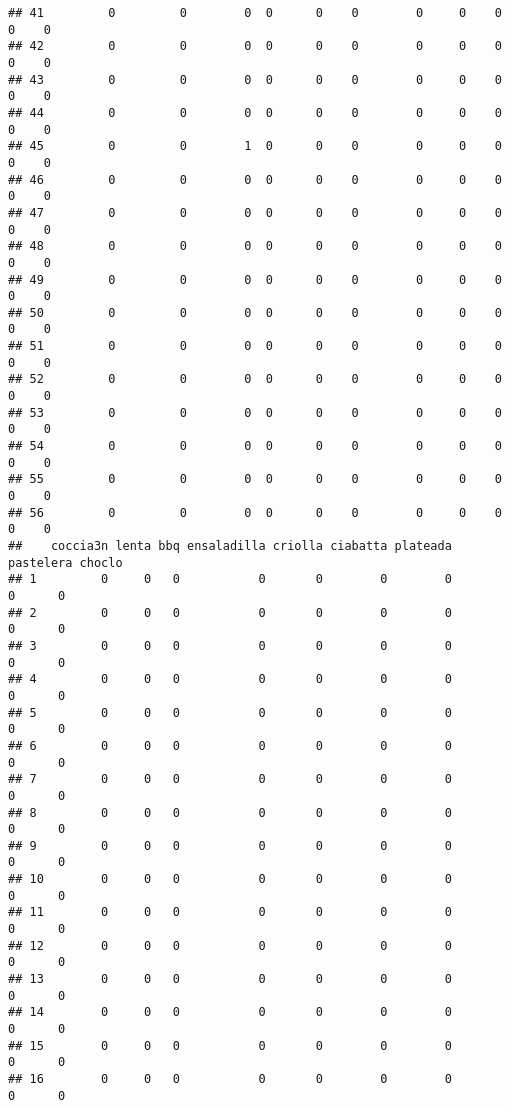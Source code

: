 \documentclass[
]{article}
\begin{document}
\begin{verbatim}
## 41         0         0        0  0      0    0        0     0    0    0    0
## 42         0         0        0  0      0    0        0     0    0    0    0
## 43         0         0        0  0      0    0        0     0    0    0    0
## 44         0         0        0  0      0    0        0     0    0    0    0
## 45         0         0        1  0      0    0        0     0    0    0    0
## 46         0         0        0  0      0    0        0     0    0    0    0
## 47         0         0        0  0      0    0        0     0    0    0    0
## 48         0         0        0  0      0    0        0     0    0    0    0
## 49         0         0        0  0      0    0        0     0    0    0    0
## 50         0         0        0  0      0    0        0     0    0    0    0
## 51         0         0        0  0      0    0        0     0    0    0    0
## 52         0         0        0  0      0    0        0     0    0    0    0
## 53         0         0        0  0      0    0        0     0    0    0    0
## 54         0         0        0  0      0    0        0     0    0    0    0
## 55         0         0        0  0      0    0        0     0    0    0    0
## 56         0         0        0  0      0    0        0     0    0    0    0
##    coccia3n lenta bbq ensaladilla criolla ciabatta plateada pastelera choclo
## 1         0     0   0           0       0        0        0         0      0
## 2         0     0   0           0       0        0        0         0      0
## 3         0     0   0           0       0        0        0         0      0
## 4         0     0   0           0       0        0        0         0      0
## 5         0     0   0           0       0        0        0         0      0
## 6         0     0   0           0       0        0        0         0      0
## 7         0     0   0           0       0        0        0         0      0
## 8         0     0   0           0       0        0        0         0      0
## 9         0     0   0           0       0        0        0         0      0
## 10        0     0   0           0       0        0        0         0      0
## 11        0     0   0           0       0        0        0         0      0
## 12        0     0   0           0       0        0        0         0      0
## 13        0     0   0           0       0        0        0         0      0
## 14        0     0   0           0       0        0        0         0      0
## 15        0     0   0           0       0        0        0         0      0
## 16        0     0   0           0       0        0        0         0      0

\end{verbatim}
\end{document}
